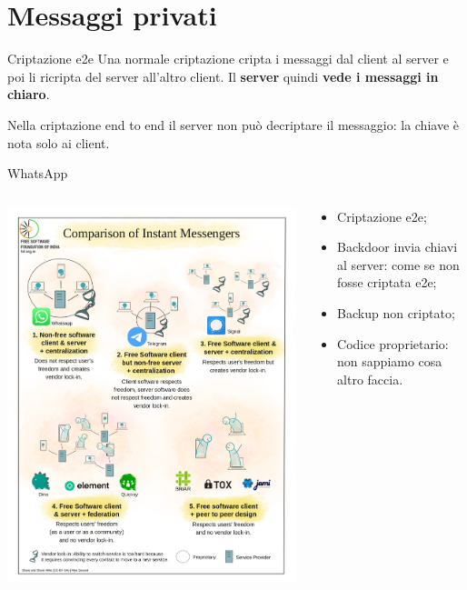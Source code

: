 
\section{Messaggi privati}

\begin{myframe}{Criptazione e2e}
  Una normale criptazione cripta i messaggi dal client al server e poi li ricripta del server all'altro client. Il \textbf{server} quindi \textbf{vede i messaggi in chiaro}.

  \medskip\pause
  Nella criptazione end to end il server non può decriptare il messaggio: la chiave è nota solo ai client.
\end{myframe}

\begin{myframe}{WhatsApp}
  \begin{columns}
    \begin{column}{.5\textwidth}
      \includegraphics[width=.9\textwidth]{img/chat}
    \end{column}
    \begin{column}{.5\textwidth}
      \begin{itemize}[<+->]
        \item Criptazione e2e;
        \item Backdoor invia chiavi al server: come se non fosse criptata e2e;
        \item Backup non criptato;
        \item Codice proprietario: non sappiamo cosa altro faccia.
      \end{itemize}
    \end{column}
  \end{columns}
\end{myframe}

